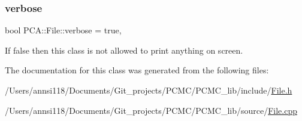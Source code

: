 \subsubsection{\texorpdfstring{verbose}{verbose}}
{\footnotesize\ttfamily bool P\+C\+A\+::\+File\+::verbose = true\hspace{0.3cm}{\ttfamily [static]}, {\ttfamily [private]}}



If false then this class is not allowed to print anything on screen. 



The documentation for this class was generated from the following files\+:\begin{DoxyCompactItemize}
\item 
/\+Users/annsi118/\+Documents/\+Git\+\_\+projects/\+P\+C\+M\+C/\+P\+C\+M\+C\+\_\+lib/include/\hyperlink{_file_8h}{File.\+h}\item 
/\+Users/annsi118/\+Documents/\+Git\+\_\+projects/\+P\+C\+M\+C/\+P\+C\+M\+C\+\_\+lib/source/\hyperlink{_file_8cpp}{File.\+cpp}\end{DoxyCompactItemize}
